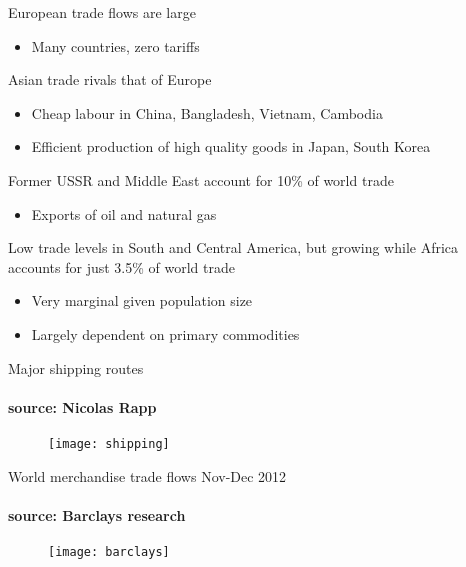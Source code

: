 \documentclass{beamer}
\begin{document}
\begin{frame}{}
 European trade flows are large
 \begin{itemize}
   \item Many countries, zero tariffs
 \end{itemize}
 \medskip
 Asian trade rivals that of Europe
 \begin{itemize}
   \item Cheap labour in China, Bangladesh, Vietnam, Cambodia
   \item Efficient production of high quality goods in Japan, South Korea
 \end{itemize}
 \medskip
 Former USSR and Middle East account for 10\% of world trade
 \begin{itemize}
   \item Exports of oil and natural gas
 \end{itemize}
 \medskip
 Low trade levels in South and Central America, but growing while Africa accounts for just 3.5\% of world trade
 \begin{itemize}
   \item Very marginal given population size
   \item Largely dependent on primary commodities
 \end{itemize}  
\end{frame}

\begin{frame}{Major shipping routes}
\framesubtitle{source: Nicolas Rapp}
  \begin{figure}
    \texttt{[image: shipping]}
  \end{figure}
\end{frame}

\begin{frame}{World merchandise trade flows Nov-Dec 2012}
\framesubtitle{source: Barclays research}
  \begin{figure}
    \texttt{[image: barclays]}
  \end{figure}
\end{frame}
\end{document}
